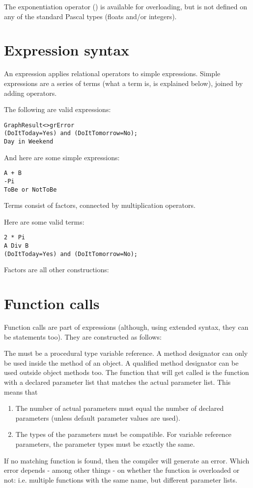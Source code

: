 \begin{remark}
The exponentiation operator (\var{**}) is available for overloading, but is
not defined on any of the standard Pascal types (floats and/or integers).
\end{remark}

\section{Expression syntax}
An expression applies relational operators to simple expressions. Simple
expressions are a series of terms (what a term is, is explained below), joined by
adding operators.

The following are valid expressions:
\begin{verbatim}
GraphResult<>grError
(DoItToday=Yes) and (DoItTomorrow=No);
Day in Weekend
\end{verbatim}
And here are some simple expressions:
\begin{verbatim}
A + B
-Pi
ToBe or NotToBe
\end{verbatim}
Terms consist of factors, connected by multiplication operators.

Here are some valid terms:
\begin{verbatim}
2 * Pi
A Div B
(DoItToday=Yes) and (DoItTomorrow=No);
\end{verbatim}
Factors are all other constructions:


\section{Function calls}
Function calls are part of expressions (although, using extended syntax,
they can be statements too). They are constructed as follows:

The  must be a procedural type variable reference.
A method designator can only be used inside the method of an object. A
qualified method designator can be used outside object methods too.
The function that will get called is the function with a declared parameter
list that matches the actual parameter list. This means that
\begin{enumerate}
\item The number of actual parameters must equal the number of declared
parameters (unless default parameter values are used).
\item The types of the parameters must be compatible. For variable
reference parameters, the parameter types must be exactly the same.
\end{enumerate}
If no matching function is found, then the compiler will generate an error.
Which error depends - among other things - on whether the function is overloaded
or not: i.e. multiple functions with the same name, but different parameter
lists.

